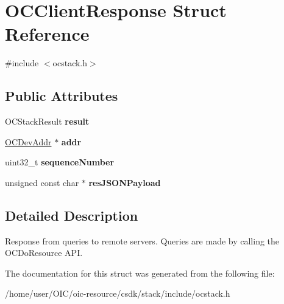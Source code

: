 \hypertarget{structOCClientResponse}{}\section{O\+C\+Client\+Response Struct Reference}
\label{structOCClientResponse}


{\ttfamily \#include $<$ocstack.\+h$>$}

\subsection*{Public Attributes}
\begin{DoxyCompactItemize}
\item 
\hypertarget{structOCClientResponse_a0cdc9f60ffb41713ebe1ea8f3a97f6b6}{}O\+C\+Stack\+Result {\bfseries result}\label{structOCClientResponse_a0cdc9f60ffb41713ebe1ea8f3a97f6b6}

\item 
\hypertarget{structOCClientResponse_ae76c5fded14e466ae1cbaf7f93f8aca2}{}\hyperlink{structOCDevAddr}{O\+C\+Dev\+Addr} $\ast$ {\bfseries addr}\label{structOCClientResponse_ae76c5fded14e466ae1cbaf7f93f8aca2}

\item 
\hypertarget{structOCClientResponse_a6abb39648a7112b78ffd3ab90546e6c4}{}uint32\+\_\+t {\bfseries sequence\+Number}\label{structOCClientResponse_a6abb39648a7112b78ffd3ab90546e6c4}

\item 
\hypertarget{structOCClientResponse_a224ddcb17c24560c66122e2e2a32a153}{}unsigned const char $\ast$ {\bfseries res\+J\+S\+O\+N\+Payload}\label{structOCClientResponse_a224ddcb17c24560c66122e2e2a32a153}

\end{DoxyCompactItemize}


\subsection{Detailed Description}
Response from queries to remote servers. Queries are made by calling the O\+C\+Do\+Resource A\+P\+I. 

The documentation for this struct was generated from the following file\+:\begin{DoxyCompactItemize}
\item 
/home/user/\+O\+I\+C/oic-\/resource/csdk/stack/include/ocstack.\+h\end{DoxyCompactItemize}
